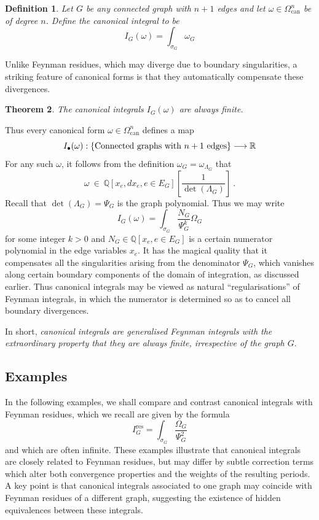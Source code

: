\documentclass[12pt]{amsart}
\newcommand{\QQ}{{\mathbb Q}}
\newcommand{\RR}{{\mathbb R}}
\newcommand{\res}{\mathrm{res}}
\theoremstyle{plain}
\newtheorem{thm}{Theorem}
\newtheorem{defn}[thm]{Definition}
\newcommand{\To}{\longrightarrow}
\newcommand{\0}{\color{blue}{\mathsf{0}}}
\begin{document}
 
 \begin{defn}
 Let $G$ be any connected graph with $n+1$ edges and let $\omega \in \Omega^{n}_{\mathrm{can}}$ 
 be of degree $n$. Define the \emph{canonical integral} to be 
 \begin{equation} \label{defn: Icanonical} I_G( \omega)  = \int_{\sigma_G}  \omega_G \end{equation}
\end{defn}
 Unlike Feynman residues, which may diverge due to boundary singularities,  a striking feature of  canonical forms is that they automatically compensate these divergences.
 \begin{thm} \cite{BrSigma} \label{thm: CanIntisfinite} The canonical integrals $I_G(\omega)$ are always finite.
 \end{thm} 


 
 Thus every canonical form $\omega\in \Omega^n_{\mathrm{can}}$ defines a map 
 \[ I_{\bullet}(\omega):  \{\hbox{Connected graphs with $n+1$ edges}\} \To \RR\]
 For any such $\omega$, it follows from the definition $\omega_G = \omega_{\Lambda_G}$ that 
 \[  \omega  \  \in \  \QQ\left[ x_e, dx_e, e\in E_G \right] \left[ \frac{1}{\det(\Lambda_G)}\right] \ . \]
 Recall that $\det(\Lambda_G) = \Psi_G$ is the graph polynomial. Thus we may write
 \begin{equation}\label{IcanisgeneralisedFeynman} I_G(\omega)= \int_{\sigma_G}  \frac{N_G}{\Psi_G^k} \Omega_G
 \end{equation}
 for some integer $k>0$ and $N_G\in \QQ[x_e, e\in E_G]$ is  a certain numerator polynomial in the edge variables $x_e$. It has  the magical quality that it compensates all the  singularities arising from the denominator $\Psi_G$, which vanishes along certain boundary components of the domain of integration, as discussed earlier.  
Thus canonical integrals may be viewed as natural “regularisations” of Feynman integrals, in which the numerator is determined so as to cancel all boundary divergences.
 
 In short, \emph{canonical integrals are generalised Feynman integrals with the extraordinary property that they are always finite, irrespective of the graph $G$}.
 
 \subsection{Examples} In the following examples, we shall compare and contrast  canonical integrals with Feynman residues, which we recall are given by the formula 
 \[ I^{\res}_G = \int_{\sigma_G} \frac{\Omega_G}{\Psi_G^2}\]
 and which are often infinite.
 These examples illustrate that canonical integrals are closely related to Feynman residues, but may differ by subtle correction terms which alter both convergence properties and the weights of the resulting periods. 
A key point is   that canonical integrals associated to one graph may coincide with Feynman residues of a different graph, suggesting the existence of hidden equivalences between these integrals.
\end{document}
